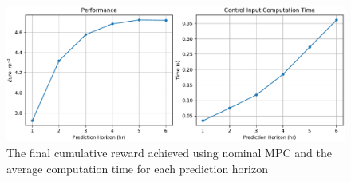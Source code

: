 \begin{figure}[H]
	\centering
	\includegraphics[width=\textwidth]{figures/mpc_nominal.pdf}
	\caption{The final cumulative reward achieved using nominal MPC and the average computation time for each prediction horizon}
	\label{fig:nominal_mpc_perf}
\end{figure}

